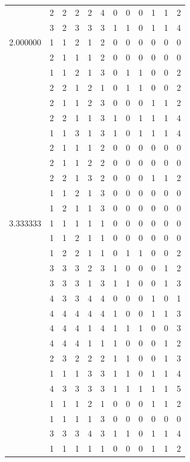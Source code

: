\documentclass[]{book}
\theoremstyle{definition}
\theoremstyle{definition}
\theoremstyle{definition}
\theoremstyle{remark}
\begin{document}
\begin{table}
{\begin{tabular}[t]{rrrrrrrrrrrr}
 & 2 & 2 & 2 & 2 & 4 & 0 & 0 & 0 & 1 & 1 & 2\\
 & 3 & 2 & 3 & 3 & 3 & 1 & 1 & 0 & 1 & 1 & 4\\
2.000000 & 1 & 1 & 2 & 1 & 2 & 0 & 0 & 0 & 0 & 0 & 0\\
 & 2 & 1 & 1 & 1 & 2 & 0 & 0 & 0 & 0 & 0 & 0\\
 & 1 & 1 & 2 & 1 & 3 & 0 & 1 & 1 & 0 & 0 & 2\\
 & 2 & 2 & 1 & 2 & 1 & 0 & 1 & 1 & 0 & 0 & 2\\
 & 2 & 1 & 1 & 2 & 3 & 0 & 0 & 0 & 1 & 1 & 2\\
 & 2 & 2 & 1 & 1 & 3 & 1 & 0 & 1 & 1 & 1 & 4\\
 & 1 & 1 & 3 & 1 & 3 & 1 & 0 & 1 & 1 & 1 & 4\\
 & 2 & 1 & 1 & 1 & 2 & 0 & 0 & 0 & 0 & 0 & 0\\
 & 2 & 1 & 1 & 2 & 2 & 0 & 0 & 0 & 0 & 0 & 0\\
 & 2 & 2 & 1 & 3 & 2 & 0 & 0 & 0 & 1 & 1 & 2\\
 & 1 & 1 & 2 & 1 & 3 & 0 & 0 & 0 & 0 & 0 & 0\\
 & 1 & 2 & 1 & 1 & 3 & 0 & 0 & 0 & 0 & 0 & 0\\
3.333333 & 1 & 1 & 1 & 1 & 1 & 0 & 0 & 0 & 0 & 0 & 0\\
 & 1 & 1 & 2 & 1 & 1 & 0 & 0 & 0 & 0 & 0 & 0\\
 & 1 & 2 & 2 & 1 & 1 & 0 & 1 & 1 & 0 & 0 & 2\\
 & 3 & 3 & 3 & 2 & 3 & 1 & 0 & 0 & 0 & 1 & 2\\
 & 3 & 3 & 3 & 1 & 3 & 1 & 1 & 0 & 0 & 1 & 3\\
 & 4 & 3 & 3 & 4 & 4 & 0 & 0 & 0 & 1 & 0 & 1\\
 & 4 & 4 & 4 & 4 & 4 & 1 & 0 & 0 & 1 & 1 & 3\\
 & 4 & 4 & 4 & 1 & 4 & 1 & 1 & 1 & 0 & 0 & 3\\
 & 4 & 4 & 4 & 1 & 1 & 1 & 0 & 0 & 0 & 1 & 2\\
 & 2 & 3 & 2 & 2 & 2 & 1 & 1 & 0 & 0 & 1 & 3\\
 & 1 & 1 & 1 & 3 & 3 & 1 & 1 & 0 & 1 & 1 & 4\\
 & 4 & 3 & 3 & 3 & 3 & 1 & 1 & 1 & 1 & 1 & 5\\
 & 1 & 1 & 1 & 2 & 1 & 0 & 0 & 0 & 1 & 1 & 2\\
 & 1 & 1 & 1 & 1 & 3 & 0 & 0 & 0 & 0 & 0 & 0\\
 & 3 & 3 & 3 & 4 & 3 & 1 & 1 & 0 & 1 & 1 & 4\\
 & 1 & 1 & 1 & 1 & 1 & 0 & 0 & 0 & 1 & 1 & 2\\

\end{tabular}}
\end{table}
\end{document}
